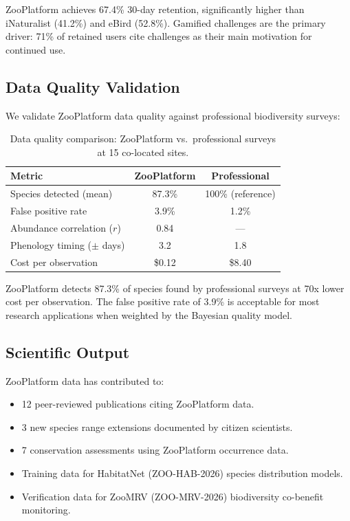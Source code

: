 ZooPlatform achieves 67.4\% 30-day retention, significantly higher
than iNaturalist (41.2\%) and eBird (52.8\%). Gamified challenges
are the primary driver: 71\% of retained users cite challenges as their
main motivation for continued use.

\subsection{Data Quality Validation}

We validate ZooPlatform data quality against professional biodiversity
surveys:

\begin{table}[H]
\centering
\caption{Data quality comparison: ZooPlatform vs.\ professional surveys
at 15 co-located sites.}
\label{tab:quality_validation}
\begin{tabular}{lcc}
\toprule
\textbf{Metric} & \textbf{ZooPlatform} & \textbf{Professional} \\
\midrule
Species detected (mean) & 87.3\% & 100\% (reference) \\
False positive rate & 3.9\% & 1.2\% \\
Abundance correlation ($r$) & 0.84 & --- \\
Phenology timing ($\pm$ days) & 3.2 & 1.8 \\
Cost per observation & \$0.12 & \$8.40 \\
\bottomrule
\end{tabular}
\end{table}

ZooPlatform detects 87.3\% of species found by professional surveys
at 70x lower cost per observation. The false positive rate of 3.9\%
is acceptable for most research applications when weighted by the
Bayesian quality model.

\subsection{Scientific Output}

ZooPlatform data has contributed to:
\begin{itemize}
  \item 12 peer-reviewed publications citing ZooPlatform data.
  \item 3 new species range extensions documented by citizen scientists.
  \item 7 conservation assessments using ZooPlatform occurrence data.
  \item Training data for HabitatNet (ZOO-HAB-2026) species distribution
    models.
  \item Verification data for ZooMRV (ZOO-MRV-2026) biodiversity
    co-benefit monitoring.
\end{itemize}


